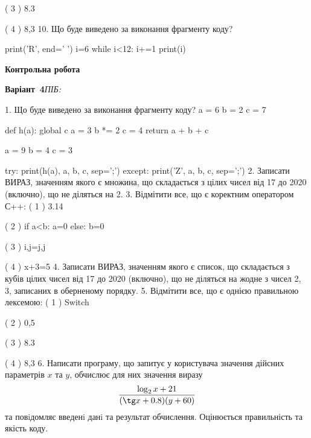 \documentclass[11pt]{article}
\begin{document}
( 3 ) 8.3

( 4 ) 8,3
\vspace{5mm}
10. Що буде виведено за виконання фрагменту коду?

print('R', end=' ')
i=6
while i<12:
    i+=1
print(i)

\vspace{5mm}










\newpage

\newpage

{\large\textbf{Контрольна робота}}

\textbf{Варіант \No\,4}\hfill \textit{ПІБ:}\,\underline{\hspace{60mm}}
\vspace{4mm}

1. Що буде виведено за виконання фрагменту коду?
a = 6
b = 2
c = 7

def h(a):
global c    a = 3
    b *= 2
    c = 4
    return a + b + c

a = 9
b = 4
c = 3

try:
    print(h(a), a, b, c, sep=';')
except:
    print('Z', a, b, c, sep=';')
\vspace{5mm}
2. 
Записати ВИРАЗ, значенням якого є множина, що складається з цілих чисел від 17 до 2020 (включно), що не діляться на 2.\vspace{5mm}
3. %
Відмітити все, що є коректним оператором С++:
( 1 ) 3.14%

( 2 ) if a<b: a=0 else: b=0

( 3 ) i,j=j,j

( 4 ) x+3=5
\vspace{5mm}
4. 
Записати ВИРАЗ, значенням якого є список, що складається з кубів цілих чисел від 17 до 2020 (включно), що не діляться на жодне з чисел 2, 3, записаних в оберненому порядку.\vspace{5mm}
5. %
Відмітити все, що є однією правильною лексемою:
( 1 ) Switch

( 2 ) 0,5

( 3 ) 8.3

( 4 ) 8,3
\vspace{5mm}
6. 
Написати програму, що запитує у користувача значення дійсних параметрів $x$ та $y$, обчислює для них значення виразу 
$$\frac{\log_{2} x + 21}{(\tg x + 0.8) (y + 60)}$$ 
та повiдомляє введенi данi та результат обчислення.
 Оцінюється правильність та якість коду.
\end{document}
